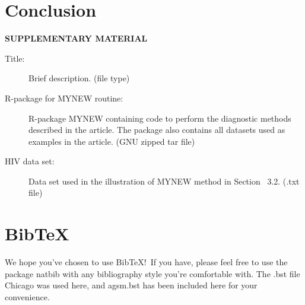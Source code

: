 \documentclass{article}
\begin{document}
\section{Conclusion}
\label{sec:conc}


\bigskip
\begin{center}
{\large\bf SUPPLEMENTARY MATERIAL}
\end{center}

\begin{description}

\item[Title:] Brief description. (file type)

\item[R-package for  MYNEW routine:] R-package  MYNEW  containing code to perform the diagnostic methods described in the article. The package also contains all datasets used as examples in the article. (GNU zipped tar file)

\item[HIV data set:] Data set used in the illustration of MYNEW method in Section~ 3.2. (.txt file)

\end{description}

\section{BibTeX}

We hope you've chosen to use BibTeX!\ If you have, please feel free to use the package natbib with any bibliography style you're comfortable with. The .bst file Chicago was used here, and agsm.bst has been included here for your convenience.
\end{document}
